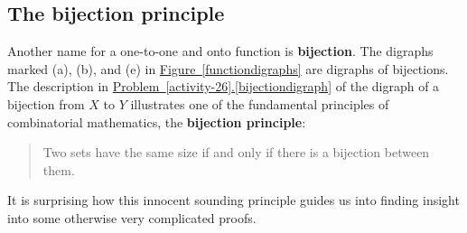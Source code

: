 \documentclass[10pt,]{book}
\newcommand{\terminology}[1]{\textbf{#1}}
\theoremstyle{plain}
\theoremstyle{definition}
\theoremstyle{definition}
\numberwithin{equation}{chapter}
\begin{document}
\subsection[{The bijection principle}]{The bijection principle}\label{subsection-3}
\hypertarget{p-146}{}%
Another name for a one-to-one and onto function is \terminology{bijection}. The digraphs marked (a), (b), and (e) in \hyperref[functiondigraphs]{Figure~\ref{functiondigraphs}} are digraphs of bijections. The description in \hyperref[bijectiondigraph]{Problem~\ref{activity-26}.\ref{bijectiondigraph}} of the digraph of a bijection from \(X\) to \(Y\) illustrates one of the fundamental principles of combinatorial mathematics, the \terminology{bijection principle}:%
\begin{quote}\hypertarget{blockquote-5}{}
\hypertarget{p-147}{}%
Two sets have the same size if and only if there is a bijection between them.%
\end{quote}
\hypertarget{p-148}{}%
It is surprising how this innocent sounding principle guides us into finding insight into some otherwise very complicated proofs.%
\typeout{************************************************}
\typeout{************************************************}
\end{document}
